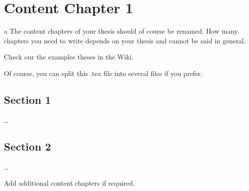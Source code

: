 
\chapter{Content Chapter 1}
\label{ch:Content1}
a
The content chapters of your thesis should of course be renamed. How many chapters you need to write depends on your thesis and cannot be said in general. 

Check our the examples theses in the Wiki. 

Of course, you can split this .tex file into several files if you prefer. 


\section{Section 1}
\label{ch:Content1:sec:Section1}

\dots


\section{Section 2}
\label{ch:Content1:sec:Section2}

\dots

Add additional content chapters if required. 